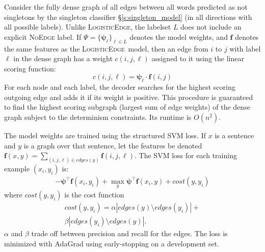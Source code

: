 \documentclass[11pt]{article}
\DeclareMathOperator*{\argmax}{arg\,max}
\newcommand{\nas}[1]{\textcolor{red}{[#1 -NAS]}}
\renewcommand{\nas}[1]{}
\newcommand{\logitedge}{\textsc{LogisticEdge}}
\begin{document}
Consider the fully dense graph of all edges between all words predicted
as not singletons by the singleton classifier \S\ref{s:singleton_model} (in all
directions with all possible labels). Unlike \logitedge, the labelset $L$ does not 
include an explicit \textsc{NoEdge} label.
If $\Psi = \{\bm\psi_\ell\}_{\ell \in L}$ denotes the model
weights, and $\bm{f}$ denotes the same features as the
\logitedge~model, then an edge from $i$ to $j$ with label $\ell$ in the
dense graph has a weight $c(i,j,\ell)$ assigned to it using the linear
scoring function: \nas{no-edge is not included here, I am guessing.
  say so explicitly since this is a subtle difference with the logit model}
\[
c(i,j,\ell) = \bm\psi_\ell \cdot \bm{f}(i,j)
\]
For each node and each label, the decoder searches for
the highest scoring outgoing edge and adds it if its weight is
positive.
This procedure is guaranteed to find the highest scoring subgraph (largest sum
of edge weights) of the dense graph subject to the determinism constraints.
Its runtime is $O(n^2)$.



The model weights are trained using the structured SVM loss.  If $x$
is a sentence and $y$ is a graph over that sentence, let the features 
be denoted $\bm{f}(x,y) = \sum_{(i,j,\ell) \in edges(y)}
\bm{f}(i,j,\ell)$.  The SVM loss for each training example $(x_i, y_i)$ is:
\begin{multline*}
-\bm\psi^\top \bm{f}(x_i,y_i) + \max_{y} \bm\psi^\top \bm{f}(x_i,y) +
\mathit{cost}(y,y_i)
\end{multline*}
where $\mathit{cost}(y,y_i)$
is the cost function
\begin{multline*}
\mathit{cost}(y,y_i) = \alpha |edges(y)\setminus edges(y_i)| + \\
\beta |edges(y_i)\setminus edges(y)|.
\end{multline*}
$\alpha$ and $\beta$ trade off between precision and recall for the
edges.  The loss is minimized with AdaGrad
using early-stopping on a development set. %
\end{document}
